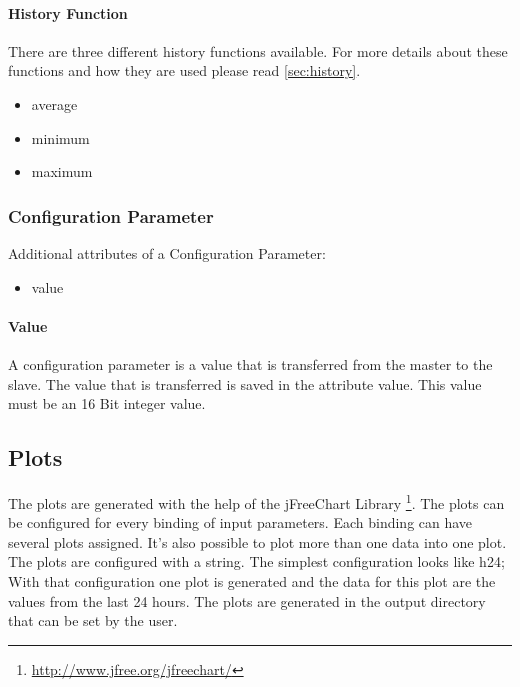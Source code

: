 \paragraph{History Function} %
\label{par:histfunc}
There are three different history functions available. For more details about these functions and how they are used please read \ref{sec:history}.
\label{par:history_function}
\begin{itemize}
    \item average
    \item minimum
    \item maximum
\end{itemize}

\subsubsection{Configuration Parameter} %
\label{ssub:configuration_parameter}
Additional attributes of a Configuration Parameter:
\begin{itemize}
    \item value
\end{itemize}

\paragraph{Value} %
\label{par:value}
A configuration parameter is a value that is transferred from the master to the slave. The value that is transferred is saved in the attribute value. This value must be an 16 Bit integer value.


\subsection{Plots} %
\label{sub:plots}
The plots are generated with the help of the jFreeChart Library \footnote{\url{http://www.jfree.org/jfreechart/}}.
The plots can be configured for every binding of input parameters. Each binding can have several plots assigned. It's also possible to plot more than one data into one plot. The plots are configured with a string. The simplest configuration looks like {\C h24;} With that configuration one plot is generated and the data for this plot are the values from the last 24 hours. The plots are generated in the output directory that can be set by the user.

